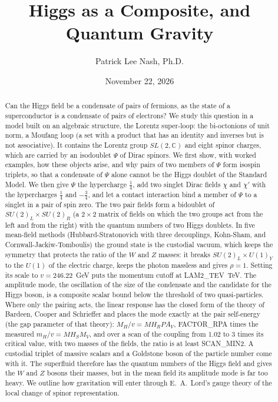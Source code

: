 \documentclass[aps,prd,twocolumn,superscriptaddress,nofootinbib,floatfix,longbibliography]{revtex4-2}
\begin{document}
\title{Higgs as a Composite, and Quantum Gravity}

\author{Patrick Lee Nash, Ph.D.}

\date{November 22, 2026}

\begin{abstract}
Can the Higgs field be a condensate of pairs of fermions, as the state of a superconductor is a condensate of pairs of
electrons? We study this question in a model built on an algebraic structure, the Lorentz super-loop: the bi-octonions
of unit norm, a Moufang loop (a set with a product that has an identity and inverses but is not associative). It
contains the Lorentz group $SL(2,\mathbb C)$ and eight spinor charges, which are carried by an isodoublet $\Psi$ of
Dirac spinors. We first show, with worked examples, how these objects arise, and why pairs of two members of $\Psi$
form isospin triplets, so that a condensate of $\Psi$ alone cannot be the Higgs doublet of the Standard Model. We then
give $\Psi$ the hypercharge $\frac14$, add two singlet Dirac fields $\chi$ and $\chi'$ with the hypercharges $\frac14$
and $-\frac34$, and let a contact interaction bind a member of $\Psi$ to a singlet in a pair of spin zero. The two pair
fields form a bidoublet of $SU(2)_L\times SU(2)_R$ (a $2\times2$ matrix of fields on which the two groups act from the
left and from the right) with the quantum numbers of two Higgs doublets. In five mean-field methods (Hubbard-Stratonovich
with three decouplings, Kohn-Sham, and Cornwall-Jackiw-Tomboulis) the ground state is the custodial vacuum, which keeps
the symmetry that protects the ratio of the $W$ and $Z$ masses: it breaks $SU(2)_L\times U(1)_Y$ to the $U(1)$ of the electric charge, keeps the photon massless
and gives $\rho=1$. Setting its scale to $v=246.22$~GeV puts the momentum cutoff at {{LAM2_TEV}}~TeV. The amplitude
mode, the oscillation of the size of the condensate and the candidate for the Higgs boson, is a composite scalar bound
below the threshold of two quasi-particles. Where only the pairing acts, the linear response has the closed form of the
theory of Bardeen, Cooper and Schrieffer and places the mode exactly at the pair self-energy (the gap parameter of
that theory): $M_H/v={{MH_RPA_V}}$,
{{FACTOR_RPA}} times the measured $m_H/v={{MH_SM_V}}$, and over a scan of the coupling from 1.02 to 3 times its critical
value, with two masses of the fields, the ratio is at least {{SCAN_MIN2}}. A custodial triplet of massive scalars and
a Goldstone boson of the particle number come with it. The superfluid therefore has the quantum numbers of the Higgs
field and gives the $W$ and $Z$ bosons their masses, but in the mean field its amplitude mode is far too heavy. We
outline how gravitation will enter through E.~A.~Lord's gauge theory of the local change of spinor representation.
\end{abstract}
\end{document}
